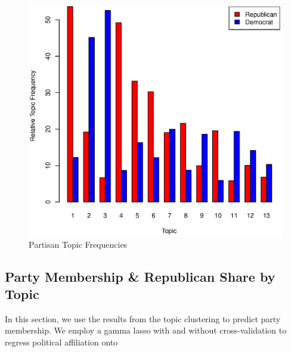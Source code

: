\documentclass[11pt, fleqn]{article}
\begin{document}
\begin{figure}[!htb]
  \centering
  \includegraphics[scale=.5]{topic.eps}
  \caption{Partisan Topic Frequencies}
  \label{fig:topic}
\end{figure}



\subsection{Party Membership \& Republican Share by Topic}

In this section, we use the results from the topic clustering to predict party membership.  We employ a gamma lasso with and without cross-validation to regress political affiliation onto 
\end{document}
